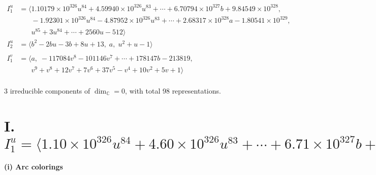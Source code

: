 \documentclass[1p]{elsarticle_modified}
\theoremstyle{definition}
\begin{document}
\begin{align*}
I^u_{1}&=\langle 
1.10179\times10^{326} u^{84}+4.59940\times10^{326} u^{83}+\cdots+6.70794\times10^{327} b+9.84549\times10^{328},\\
\phantom{I^u_{1}}&\phantom{= \langle  }-1.92301\times10^{326} u^{84}-4.87952\times10^{326} u^{83}+\cdots+2.68317\times10^{328} a-1.80541\times10^{329},\\
\phantom{I^u_{1}}&\phantom{= \langle  }u^{85}+3 u^{84}+\cdots+2560 u-512\rangle \\
I^u_{2}&=\langle 
b^2-2 b u-3 b+8 u+13,\;a,\;u^2+u-1\rangle \\
\\
I^v_{1}&=\langle 
a,\;-117084 v^8-101146 v^7+\cdots+178147 b-213819,\\
\phantom{I^v_{1}}&\phantom{= \langle  }v^9+v^8+12 v^7+7 v^6+37 v^5- v^4+10 v^2+5 v+1\rangle \\
\end{align*}
\raggedright * 3 irreducible components of $\dim_{\mathbb{C}}=0$, with total 98 representations.\\
\newpage
\renewcommand{\arraystretch}{1}
\centering \section*{I. $I^u_{1}= \langle 1.10\times10^{326} u^{84}+4.60\times10^{326} u^{83}+\cdots+6.71\times10^{327} b+9.85\times10^{328},\;-1.92\times10^{326} u^{84}-4.88\times10^{326} u^{83}+\cdots+2.68\times10^{328} a-1.81\times10^{329},\;u^{85}+3 u^{84}+\cdots+2560 u-512 \rangle$}
\flushleft \textbf{(i) Arc colorings}\\
\end{document}
